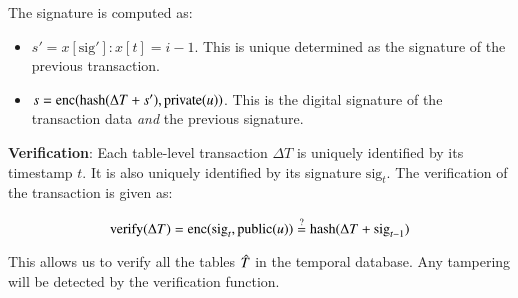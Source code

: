 The signature is computed as:

\begin{itemize}
    \item $s' = x[\mathrm{sig'}]: x[t] = i-1$. This is unique determined as the
        signature of the previous transaction.
    \item $s = \operatorname{enc}(\mathrm{hash}(\Delta T + s'), \operatorname{private}(u))$. This is the
        digital signature of the transaction data {\em and} the previous
        signature.
\end{itemize}

\medskip

{\bf Verification}: \quad Each table-level transaction $\Delta T$ is uniquely
identified by its timestamp $t$.  It is also uniquely identified by its
signature $\mathrm{sig}_t$.  The verification of the transaction is given as:

$$\mathrm{verify}(\Delta T) = \operatorname{enc}(\mathrm{sig}_t, \operatorname{public}(u)) 
    \overset{?}= \mathrm{hash}(\Delta T + \mathrm{sig}_{t-1}) $$

This allows us to verify all the tables $\Hat T$ in the temporal database.  Any
tampering will be detected by the verification function.



